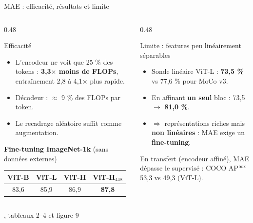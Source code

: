 \documentclass[aspectratio=169,10pt]{beamer}
\newcommand{\src}[1]{\par\vfill\hfill{\tiny\color{grisE}#1}}
\begin{document}
\begin{frame}{MAE : efficacité, résultats et limite}
  \begin{columns}[T]
    \begin{column}{0.48\textwidth}
      \begin{block}{Efficacité}
        \footnotesize
        \begin{itemize}
          \item L'encodeur ne voit que 25 \% des tokens : \textbf{3,3$\times$ moins de FLOPs}, entraînement 2,8 à 4,1$\times$ plus rapide.
          \item Décodeur : $\approx$ 9 \% des FLOPs par token.
          \item Le recadrage aléatoire suffit comme augmentation.
        \end{itemize}
      \end{block}
      \footnotesize
      \textbf{Fine-tuning ImageNet-1k} (sans données externes)\\[1mm]
      \begin{tabular}{@{}c c c c@{}}
        \toprule
        ViT-B & ViT-L & ViT-H & ViT-H$_{448}$\\
        \midrule
        83,6 & 85,9 & 86,9 & \textbf{87,8}\\
        \bottomrule
      \end{tabular}
    \end{column}
    \begin{column}{0.48\textwidth}
      \begin{alertblock}{Limite : features peu linéairement séparables}
        \footnotesize
        \begin{itemize}
          \item Sonde linéaire ViT-L : \textbf{73,5 \%} vs 77,6 \% pour MoCo v3.
          \item En affinant \textbf{un seul} bloc : 73,5 $\to$ \textbf{81,0 \%}.
          \item $\Rightarrow$ représentations riches mais \textbf{non linéaires} : MAE exige un \textbf{fine-tuning}.
        \end{itemize}
      \end{alertblock}
      \footnotesize En transfert (encodeur affiné), MAE dépasse le supervisé : COCO AP$^{\text{box}}$ 53,3 vs 49,3 (ViT-L).
    \end{column}
  \end{columns}
  \src{\citet{he2022mae}, tableaux 2--4 et figure 9}
\end{frame}
\end{document}
